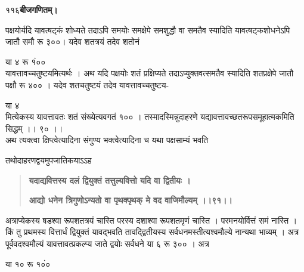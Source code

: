 \documentclass[11pt, openany]{book}
\begin{document}
\thispagestyle{empty}
\newpage

\onehalfspacing
११६\hspace{2in}\textbf{बीजगणितम्।} 

\vspace{5mm}

\begin{sloppypar}
\hangindent=0.2in पक्षयोर्यदि यावत्षट्कं शोध्यते तदाऽपि समयोः समक्षेपे समशुद्धौ वा समतैव स्यादिति यावत्षट्कशोधनेऽपि जातौ समौ रू ३००\hspace{0.5in}। यदेव शतत्रयं तदेव शतोनं

\hspace{1.35in}या ४ रू १ं००\\ 

\hangindent=0.2in यावत्तावच्चतुष्टयमित्यर्थः । अथ यदि पक्षयोः शतं प्रक्षिप्यते तदाऽप्युक्तवत्समतैव स्यादिति शतप्रक्षेपे जातौ पक्षौ रू ४०० । यदेव शतचतुष्टयं तदेव यावत्तावच्चतुष्टय-

\hspace{0.75in}या ४ \\

\hangindent=0.2in मित्येकस्य यावत्तावतः शतं संख्येत्यवगतं १०० । तस्मादस्मिन्नुदाहरणे यद्यावत्तावच्छतरूपसमूहात्मकमिति सिद्धम् ।। ९० ।।\\

\hangindent=0.2in \hspace{0.2in}अथ त्यक्त्वा क्षिप्त्वेत्यादिना संगुण्य भक्त्वेत्यादिना च यथा पक्षसाम्यं भवति

\hangindent=0.2in तथोदाहरणद्वयमुपजातिकयाऽऽह\textendash

\begin{quote}
\hspace{0.5in}\textbf{यदाद्यवित्तस्य दलं द्वियुक्तं तत्तुल्यवित्तो यदि वा द्वितीयः ।}

\hspace{0.5in}\textbf{आद्यो धनेन त्रिगुणोऽन्यतो वा पृथक्पृथक् मे वद वाजिमौल्यम् ।।९१।। }
\end{quote}

\hangindent=0.2in \hspace{0.2in}अत्राप्येकस्य षडश्वा रूपशतत्रयं चास्ति परस्य दशाश्वा रूपशतमृणं चास्ति । परमनयोर्वित्तं समं नास्ति । किं तु प्रथमस्य वित्तार्धं द्वियुक्तं यावद्भवति तावद्द्वितीयस्य सर्वधनमस्तीत्यश्वमौल्ये नान्यथा भाव्यम् । अत्र पूर्ववदश्वमौल्यं यावत्तावत्प्रकल्प्य जाते द्वयोः सर्वधने या ६ रू ३०० । अत्र 

\hspace{4.5in}या १० रू १०ं० \\


\end{sloppypar}
\end{document}
